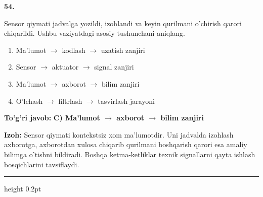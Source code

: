 \documentclass[10pt,a4paper,oneside]{article}
\begin{document}
\noindent\textbf{\color{ink}54.}
\par
Sensor qiymati jadvalga yozildi, izohlandi va keyin qurilmani o'chirish qarori chiqarildi. Ushbu vaziyatdagi asosiy tushunchani aniqlang.
\begin{enumerate}[label=\Alph*),leftmargin=9mm]
\item Ma'lumot \ensuremath{\to} kodlash \ensuremath{\to} uzatish zanjiri
\item Sensor \ensuremath{\to} aktuator \ensuremath{\to} signal zanjiri
\item Ma'lumot \ensuremath{\to} axborot \ensuremath{\to} bilim zanjiri
\item O'lchash \ensuremath{\to} filtrlash \ensuremath{\to} tasvirlash jarayoni
\end{enumerate}
\begin{tcolorbox}[enhanced,breakable,colback=teal!4,colframe=teal!50!black,boxrule=0.5pt,arc=1.1mm,left=3mm,right=3mm,top=1.7mm,bottom=1.7mm,before skip=2mm,after skip=2mm]
\textbf{\color{teal}To'g'ri javob:} \textbf{C) Ma'lumot \ensuremath{\to} axborot \ensuremath{\to} bilim zanjiri}
\par\smallskip
\textbf{Izoh:} Sensor qiymati kontekstsiz xom ma'lumotdir. Uni jadvalda izohlash axborotga, axborotdan xulosa chiqarib qurilmani boshqarish qarori esa amaliy bilimga o'tishni bildiradi. Boshqa ketma-ketliklar texnik signallarni qayta ishlash bosqichlarini tavsiflaydi.
\end{tcolorbox}
\vspace{2mm}\hrule height 0.2pt \vspace{3mm}
\end{document}
